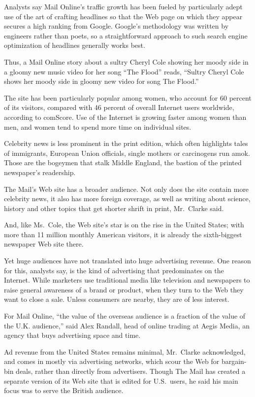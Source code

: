 ﻿\documentclass[12pt]{article}
\begin{document}
Analysts say Mail Online's traffic growth has been fueled by particularly adept use of the art of
crafting headlines so that the Web page on which they appear secures a high ranking from Google.
Google's methodology was written by engineers rather than poets, so a straightforward approach to
such search engine optimization of headlines generally works best.

Thus, a Mail Online story about a sultry Cheryl Cole showing her moody side in a gloomy new music
video for her song ``The Flood'' reads, ``Sultry Cheryl Cole shows her moody side in gloomy new
video for song The Flood.''

The site has been particularly popular among women, who account for 60 percent of its visitors,
compared with 46 percent of overall Internet users worldwide, according to comScore. Use of the
Internet is growing faster among women than men, and women tend to spend more time on individual
sites.

Celebrity news is less prominent in the print edition, which often highlights tales of immigrants,
European Union officials, single mothers or carcinogens run amok. Those are the bogeymen that stalk
Middle England, the bastion of the printed newspaper's readership.

The Mail's Web site has a broader audience. Not only does the site contain more celebrity news, it
also has more foreign coverage, as well as writing about science, history and other topics that get
shorter shrift in print, Mr.~Clarke said.

And, like Ms.~Cole, the Web site's star is on the rise in the United States; with more than 11
million monthly American visitors, it is already the sixth-biggest newspaper Web site there.

Yet huge audiences have not translated into huge advertising revenue. One reason for this, analysts
say, is the kind of advertising that predominates on the Internet. While marketers use traditional
media like television and newspapers to raise general awareness of a brand or product, when they
turn to the Web they want to close a sale. Unless consumers are nearby, they are of less interest.

For Mail Online, ``the value of the overseas audience is a fraction of the value of the U.K.
audience,'' said Alex Randall, head of online trading at Aegis Media, an agency that buys
advertising space and time.

Ad revenue from the United States remains minimal, Mr.~Clarke acknowledged, and comes in mostly via
advertising networks, which scour the Web for bargain-bin deals, rather than directly from
advertisers. Though The Mail has created a separate version of its Web site that is edited for
U.S.~users, he said his main focus was to serve the British audience.
\end{document}
